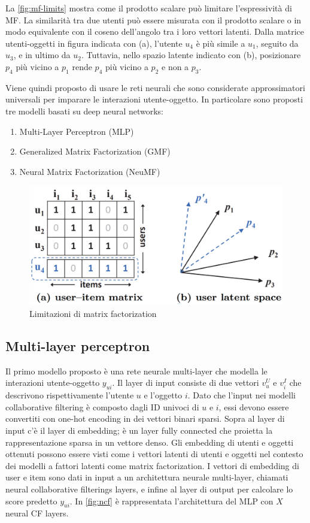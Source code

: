 \documentclass[12pt,italian]{report}
\begin{document}
La \autoref{fig:mf-limits} mostra come il prodotto scalare può limitare l'espressività di MF. La similarità tra due utenti può essere misurata con il prodotto scalare o in modo equivalente con il coseno dell'angolo tra i loro vettori latenti. Dalla matrice utenti-oggetti in figura indicata con (a), l'utente $u_4$ è più simile a $u_1$, seguito da $u_3$, e in ultimo da $u_2$. Tuttavia, nello spazio latente indicato con (b), posizionare $p_4$ più vicino a $p_1$ rende $p_4$ più vicino a $p_2$ e non a $p_3$.

Viene quindi proposto di usare le reti neurali che sono considerate approssimatori universali \cite{NN-universal-approx} per imparare le interazioni utente-oggetto. In particolare sono proposti tre modelli basati su deep neural networks:
\begin{enumerate}
 \item Multi-Layer Perceptron (MLP)
 \item Generalized Matrix Factorization (GMF)
 \item Neural Matrix Factorization (NeuMF)
\end{enumerate}

\begin{figure}
  \includegraphics[width=\linewidth]{immagini/user_item_vectors.png}
  \caption{Limitazioni di matrix factorization}
  \label{fig:mf-limits}
\end{figure}

\subsection{Multi-layer perceptron}
Il primo modello proposto è una rete neurale multi-layer che modella le interazioni utente-oggetto $y_{ui}$. Il layer di input consiste di due vettori $v_u^U$ e $v_i^I$ che descrivono rispettivamente l'utente $u$ e l'oggetto $i$. Dato che l'input nei modelli collaborative filtering è composto dagli ID univoci di $u$ e $i$, essi devono essere convertiti con one-hot encoding in dei vettori binari sparsi.
Sopra al layer di input c'è il layer di embedding; è un layer fully connected che proietta la rappresentazione sparsa in un vettore denso.
Gli embedding di utenti e oggetti ottenuti possono essere visti come i vettori latenti di utenti e oggetti nel contesto dei modelli a fattori latenti come matrix factorization.
I vettori di embedding di user e item sono dati in input a un architettura neurale multi-layer, chiamati neural collaborative filterings layers, e infine al layer di output per calcolare lo score predetto $y_{ui}$. In \autoref{fig:ncf} è rappresentata l'architettura del MLP con $X$ neural CF layers.
\end{document}

